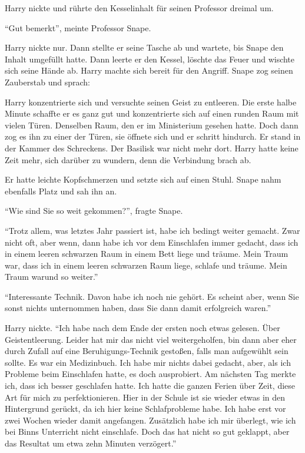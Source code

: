 Harry nickte und rührte den Kesselinhalt für seinen Professor dreimal um.

\enquote{Gut bemerkt}, meinte Professor Snape.

Harry nickte nur. Dann stellte er seine Tasche ab und wartete, bis Snape den Inhalt umgefüllt hatte. Dann leerte er den Kessel, löschte das Feuer und wischte sich seine Hände ab. Harry machte sich bereit für den Angriff. Snape zog seinen Zauberstab und sprach: 

Harry konzentrierte sich und versuchte seinen Geist zu entleeren. Die erste halbe Minute schaffte er es ganz gut und konzentrierte sich auf einen runden Raum mit vielen Türen. Denselben Raum, den er im Ministerium gesehen hatte. Doch dann zog es ihn zu einer der Türen, sie öffnete sich und er schritt hindurch. Er stand in der Kammer des Schreckens. Der Basilisk war nicht mehr dort. Harry hatte keine Zeit mehr, sich darüber zu wundern, denn die Verbindung brach ab.

Er hatte leichte Kopfschmerzen und setzte sich auf einen Stuhl. Snape nahm ebenfalls Platz und sah ihn an.

\enquote{Wie sind Sie so weit gekommen?}, fragte Snape.

\enquote{Trotz allem, was letztes Jahr passiert ist, habe ich bedingt weiter gemacht. Zwar nicht oft, aber wenn, dann habe ich vor dem Einschlafen immer gedacht, dass ich in einem leeren schwarzen Raum in einem Bett liege und träume. Mein Traum war, dass ich in einem leeren schwarzen Raum liege, schlafe und träume. Mein Traum war\abs und so weiter.}

\enquote{Interessante Technik. Davon habe ich noch nie gehört. Es scheint aber, wenn Sie sonst nichts unternommen haben, dass Sie dann damit erfolgreich waren.}

Harry nickte. \enquote{Ich habe nach dem Ende der ersten  noch etwas gelesen. Über Geistentleerung. Leider hat mir das nicht viel weitergeholfen, bin dann aber eher durch Zufall auf eine Beruhigungs-Technik gestoßen, falls man aufgewühlt sein sollte. Es war ein Medizinbuch. Ich habe mir nichts dabei gedacht, aber, als ich Probleme beim Einschlafen hatte, es doch ausprobiert. Am nächsten Tag merkte ich, dass ich besser geschlafen hatte. Ich hatte die ganzen Ferien über Zeit, diese Art für mich zu perfektionieren. Hier in der Schule ist sie wieder etwas in den Hintergrund gerückt, da ich hier keine Schlafprobleme habe. Ich habe erst vor zwei Wochen wieder damit angefangen. Zusätzlich habe ich mir überlegt, wie ich bei Binns Unterricht nicht einschlafe. Doch das hat nicht so gut geklappt, aber das Resultat um etwa zehn Minuten verzögert.}


